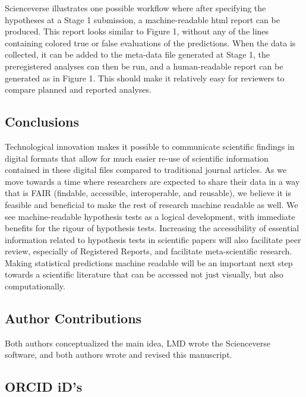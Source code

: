 \documentclass[
  english,
  doc,floatsintext]{apa6}
\begin{document}
Scienceverse illustrates one possible workflow where after specifying the hypotheses at a Stage 1 submission, a machine-readable html report can be produced. This report looks similar to Figure 1, without any of the lines containing colored true or false evaluations of the predictions. When the data is collected, it can be added to the meta-data file generated at Stage 1, the preregistered analyses can then be run, and a human-readable report can be generated as in Figure 1. This should make it relatively easy for reviewers to compare planned and reported analyses.

\hypertarget{conclusions}{%
\subsection{Conclusions}\label{conclusions}}

Technological innovation makes it possible to communicate scientific findings in digital formats that allow for much easier re-use of scientific information contained in these digital files compared to traditional journal articles. As we move towards a time where researchers are expected to share their data in a way that is FAIR (findable, accessible, interoperable, and reusable), we believe it is feasible and beneficial to make the rest of research machine readable as well. We see machine-readable hypothesis tests as a logical development, with immediate benefits for the rigour of hypothesis tests. Increasing the accessibility of essential information related to hypothesis tests in scientific papers will also facilitate peer review, especially of Registered Reports, and facilitate meta-scientific research. Making statistical predictions machine readable will be an important next step towards a scientific literature that can be accessed not just visually, but also computationally.

\newpage

\hypertarget{author-contributions}{%
\subsection{Author Contributions}\label{author-contributions}}

Both authors conceptualized the main idea, LMD wrote the Scienceverse software, and both authors wrote and revised this manuscript.

\hypertarget{orcid-ids}{%
\subsection{ORCID iD's}\label{orcid-ids}}
\end{document}
